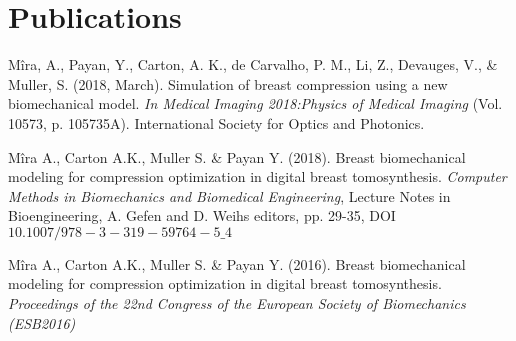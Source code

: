 \chapter*{Publications}\label{section:publications}
\begin{description}

\item  Mîra, A., Payan, Y., Carton, A. K., de Carvalho, P. M., Li, Z., Devauges, V., \& Muller, S. (2018, March). Simulation of breast compression using a new biomechanical model. \textit {In Medical Imaging 2018:Physics of Medical Imaging} (Vol. 10573, p. 105735A). International Society for Optics and Photonics. \\

\item  Mîra A., Carton A.K., Muller S. \& Payan Y. (2018). Breast biomechanical modeling for compression optimization in digital breast tomosynthesis. \textit{Computer Methods in Biomechanics and Biomedical Engineering}, Lecture Notes in Bioengineering, A. Gefen and D. Weihs editors, pp. 29-35, DOI $10.1007/978-3-319-59764-5\_4$ \\

\item  Mîra A., Carton A.K., Muller S. \& Payan Y. (2016). Breast biomechanical modeling for compression optimization in digital breast tomosynthesis. \textit{Proceedings of the 22nd Congress of the European Society of Biomechanics (ESB2016)}
\end{description}

\cleardoublepage